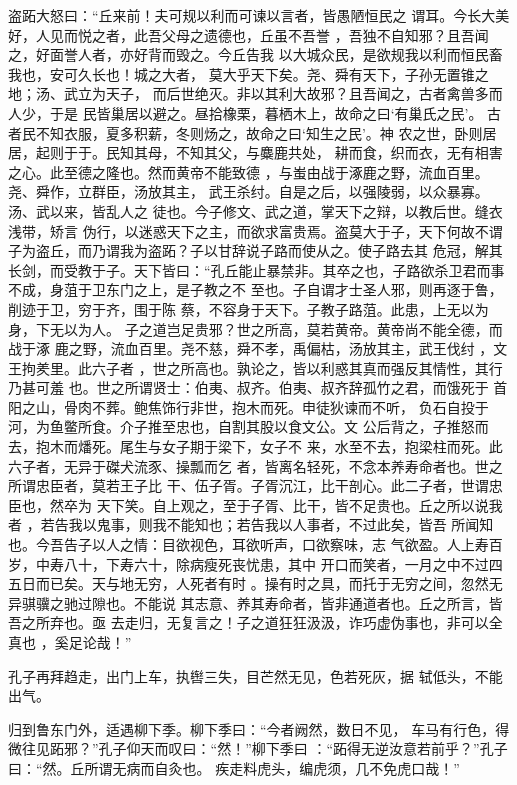 \documentclass[a4paper,12pt,UTF8,twoside]{ctexbook}
\begin{document}
盗跖大怒曰：“丘来前！夫可规以利而可谏以言者，皆愚陋恒民之 谓耳。今长大美好，人见而悦之者，此吾父母之遗德也，丘虽不吾誉 ，吾独不自知邪？且吾闻之，好面誉人者，亦好背而毁之。今丘告我 以大城众民，是欲规我以利而恒民畜我也，安可久长也！城之大者， 莫大乎天下矣。尧、舜有天下，子孙无置锥之地；汤、武立为天子， 而后世绝灭。非以其利大故邪？且吾闻之，古者禽兽多而人少，于是 民皆巢居以避之。昼拾橡栗，暮栖木上，故命之曰‘有巢氏之民’。 古者民不知衣服，夏多积薪，冬则炀之，故命之曰‘知生之民’。神 农之世，卧则居居，起则于于。民知其母，不知其父，与麋鹿共处， 耕而食，织而衣，无有相害之心。此至德之隆也。然而黄帝不能致德 ，与蚩由战于涿鹿之野，流血百里。尧、舜作，立群臣，汤放其主， 武王杀纣。自是之后，以强陵弱，以众暴寡。汤、武以来，皆乱人之 徒也。今子修文、武之道，掌天下之辩，以教后世。缝衣浅带，矫言 伪行，以迷惑天下之主，而欲求富贵焉。盗莫大于子，天下何故不谓 子为盗丘，而乃谓我为盗跖？子以甘辞说子路而使从之。使子路去其 危冠，解其长剑，而受教于子。天下皆曰：“孔丘能止暴禁非。其卒之也，子路欲杀卫君而事不成，身菹于卫东门之上，是子教之不 至也。子自谓才士圣人邪，则再逐于鲁，削迹于卫，穷于齐，围于陈 蔡，不容身于天下。子教子路菹。此患，上无以为身，下无以为人。 子之道岂足贵邪？世之所高，莫若黄帝。黄帝尚不能全德，而战于涿 鹿之野，流血百里。尧不慈，舜不孝，禹偏枯，汤放其主，武王伐纣 ，文王拘羑里。此六子者 ，世之所高也。孰论之，皆以利惑其真而强反其情性，其行乃甚可羞 也。世之所谓贤士：伯夷、叔齐。伯夷、叔齐辞孤竹之君，而饿死于 首阳之山，骨肉不葬。鲍焦饰行非世，抱木而死。申徒狄谏而不听， 负石自投于河，为鱼鳖所食。介子推至忠也，自割其股以食文公。文 公后背之，子推怒而去，抱木而燔死。尾生与女子期于梁下，女子不 来，水至不去，抱梁柱而死。此六子者，无异于磔犬流豕、操瓢而乞 者，皆离名轻死，不念本养寿命者也。世之所谓忠臣者，莫若王子比 干、伍子胥。子胥沉江，比干剖心。此二子者，世谓忠臣也，然卒为 天下笑。自上观之，至于子胥、比干，皆不足贵也。丘之所以说我者 ，若告我以鬼事，则我不能知也；若告我以人事者，不过此矣，皆吾 所闻知也。今吾告子以人之情：目欲视色，耳欲听声，口欲察味，志 气欲盈。人上寿百岁，中寿八十，下寿六十，除病瘦死丧忧患，其中 开口而笑者，一月之中不过四五日而已矣。天与地无穷，人死者有时 。操有时之具，而托于无穷之间，忽然无异骐骥之驰过隙也。不能说 其志意、养其寿命者，皆非通道者也。丘之所言，皆吾之所弃也。亟 去走归，无复言之！子之道狂狂汲汲，诈巧虚伪事也，非可以全真也 ，奚足论哉！”

孔子再拜趋走，出门上车，执辔三失，目芒然无见，色若死灰，据 轼低头，不能出气。

归到鲁东门外，适遇柳下季。柳下季曰：“今者阙然，数日不见， 车马有行色，得微往见跖邪？”孔子仰天而叹曰：“然！”柳下季曰 ：“跖得无逆汝意若前乎？”孔子曰：“然。丘所谓无病而自灸也。 疾走料虎头，编虎须，几不免虎口哉！”
\end{document}
